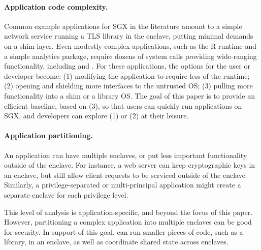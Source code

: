 \paragraph{Application code complexity.}
Common example applications for SGX in the literature 
amount to a simple network service running a TLS
library in the enclave, putting minimal demands on a shim layer. 
Even modestly complex applications, such as the R runtime and a simple
analytics package, require dozens of system calls providing wide-ranging functionality, 
including  and .
For these applications, the options for the user or developer become: 
(1) modifying the application to require less of the runtime; (2) opening and shielding more 
interfaces to the untrusted OS; (3) pulling more functionality into a shim or a library OS.
The goal of this paper is to provide an efficient baseline, based on (3),
so that users can quickly run applications on SGX, and developers can 
explore (1) or (2) at their leisure.

\paragraph{Application partitioning.} An application can have multiple
enclaves, or put less important functionality outside of the enclave.
For instance, a web server can keep cryptographic keys in an enclave,
but still allow client requests to be serviced outside of the enclave.
Similarly, a privilege-separated or multi-principal application might create a separate enclave for
each privilege level.

This level of analysis is application-specific, and beyond the focus of this paper.
However, partitioning a complex application into multiple enclaves
can be good for security. In support of this goal,
\graphenesgx{} can run smaller pieces of code, such as a library, in an enclave, as well as
coordinate shared state across enclaves.



\begin{comment}
\fixmedp{Did a first cut at 2.2; needs to integrate the figure (or drop it).  I didn't know what to write for 2.3 yet.  I left the old text below for now (if there is anything you really want to save), but it needs to go away}

\subsection{Open Challenges}

\fixmedp{Here, I would give a taste of some of the issues we solve and why they are hard, like dynamic loading (and maybe fork or IPC).  Keep it short, a few paragraphs.}
\end{comment}


